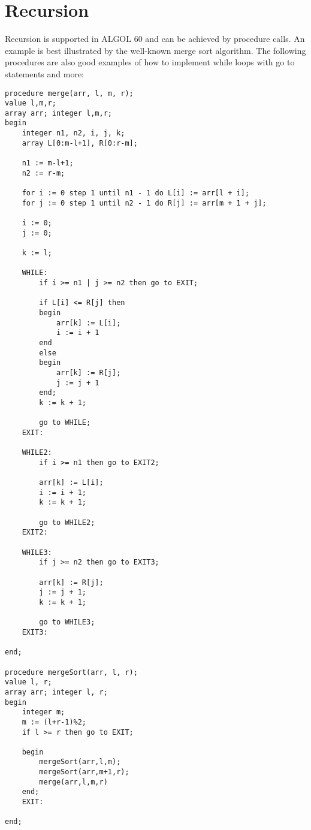\documentclass{article}
\begin{document}
\newpage

\section{Recursion}
Recursion is supported in ALGOL 60 and can be achieved by procedure calls. An example is best illustrated by the well-known merge sort algorithm. The following procedures are also good examples of how to implement while loops with go to statements and more:

\begin{lstlisting}[language={[60]algol}]
procedure merge(arr, l, m, r);
value l,m,r;
array arr; integer l,m,r;
begin
    integer n1, n2, i, j, k;
    array L[0:m-l+1], R[0:r-m];
    
    n1 := m-l+1;
    n2 := r-m;
    
    for i := 0 step 1 until n1 - 1 do L[i] := arr[l + i];
    for j := 0 step 1 until n2 - 1 do R[j] := arr[m + 1 + j];
    
    i := 0;
    j := 0;
    
    k := l;
    
    WHILE:
        if i >= n1 | j >= n2 then go to EXIT;
        
        if L[i] <= R[j] then 
        begin 
            arr[k] := L[i]; 
            i := i + 1 
        end
        else
        begin
            arr[k] := R[j];
            j := j + 1
        end;
        k := k + 1;
        
        go to WHILE;
    EXIT:
    
    WHILE2:
        if i >= n1 then go to EXIT2;
        
        arr[k] := L[i];
        i := i + 1;
        k := k + 1;
        
        go to WHILE2;
    EXIT2:
    
    WHILE3:
        if j >= n2 then go to EXIT3;
    
        arr[k] := R[j];
        j := j + 1;
        k := k + 1;
    
        go to WHILE3;
    EXIT3:
    
end;
    
procedure mergeSort(arr, l, r);
value l, r;
array arr; integer l, r;
begin
    integer m;
    m := (l+r-1)%2;
    if l >= r then go to EXIT;
    
    begin
        mergeSort(arr,l,m);
        mergeSort(arr,m+1,r);
        merge(arr,l,m,r)
    end;
    EXIT:

end;
\end{lstlisting}
\end{document}
